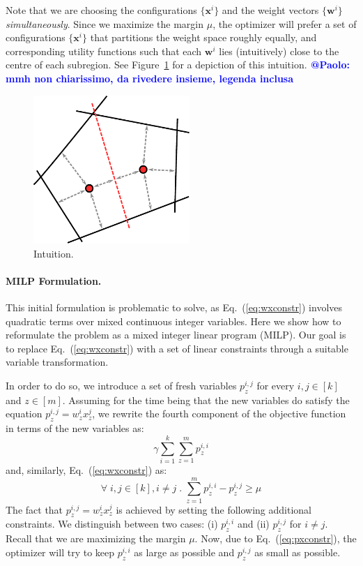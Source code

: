 \documentclass{article}
\renewcommand\[{\begin{equation}}
\renewcommand\]{\end{equation}}
\newcommand{\vecvar}[1]{\ensuremath{\boldsymbol{#1}}}
\newcommand{\vw}{\vecvar{w}}
\newcommand{\vx}{\vecvar{x}}
\newcommand{\andrea}[1]{{\bf \textcolor{blue}{{\fbox{Andrea:} #1}}}}
\begin{document}
Note that we are choosing the configurations $\{ \vx^i \}$ and the weight vectors $\{
\vw^i \}$ {\em simultaneously}. Since we maximize the margin $\mu$, the optimizer
will prefer a set of configurations $\{ \vx^{i} \}$ that partitions the weight space
roughly equally, and corresponding utility functions such that each $\vw^{i}$
lies (intuitively) close to the centre of each subregion. See
Figure~\ref{fig:setmargin} for a depiction of this intuition.\andrea{@Paolo: mmh non chiarissimo, da rivedere insieme, legenda inclusa}

\begin{figure}[t]
    \begin{center}
        \includegraphics[width=16em]{figures/setmargin}
    \end{center}
    \caption{\label{fig:setmargin} Intuition.}
\end{figure}

\paragraph{MILP Formulation.} This initial formulation is problematic to solve,
as Eq.~(\ref{eq:wxconstr}) involves quadratic terms over mixed continuous integer variables. 
Here we show how to reformulate the
problem as a mixed integer linear program (MILP). Our goal is to
replace Eq.~(\ref{eq:wxconstr}) with a set of linear constraints through
a suitable variable transformation.

In order to do so, we introduce a set of fresh variables $p^{i,j}_z$ for every
$i,j\in[k]$ and $z\in[m]$. Assuming for the time being that the new variables
do satisfy the equation $p^{i,j}_z = w^i_z x^j_z$, we rewrite the fourth
component of the objective function in terms of the new variables as:
%
$$ \gamma \sum_{i=1}^k \sum_{z=1}^m p^{i,i}_z $$
%
and, similarly, Eq.~(\ref{eq:wxconstr}) as:
%
\[ \forall \; i, j \in [k], i \neq j \;.\; \sum_{z=1}^m p^{i,i}_z - p^{i,j}_z \ge \mu \label{eq:pxconstr} \]
%
The fact that $p^{i,j}_z = w^{i}_z x^{j}_z$ is achieved by
setting the following additional constraints. We distinguish between two cases:
(i) $p^{i,i}_z$ and (ii) $p^{i,j}_z$ for $i \ne j$.  Recall that we are
maximizing the margin $\mu$. Now, due to Eq.~(\ref{eq:pxconstr}), the optimizer will
try to keep $p^{i,i}_z$ as large as possible and $p^{i,j}_z$ as small as
possible.
\end{document}
